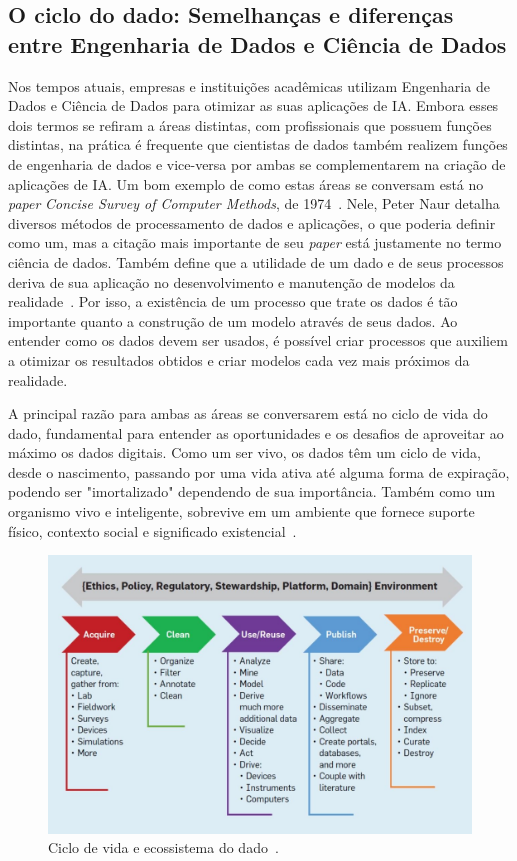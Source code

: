 \documentclass[Portugues,Final]{ic-tese-v3}
\begin{document}
\subsection{O ciclo do dado: Semelhanças e diferenças entre Engenharia de Dados e Ciência de Dados}

Nos tempos atuais, empresas e instituições acadêmicas utilizam Engenharia de Dados e Ciência de Dados para otimizar as suas aplicações de IA. Embora esses dois termos se refiram a áreas distintas, com profissionais que possuem funções distintas, na prática é frequente que cientistas de dados também realizem funções de engenharia de dados e vice-versa por ambas se complementarem na criação de aplicações de IA. Um bom exemplo de como estas áreas se conversam está no \textit{paper} \textit{Concise Survey of Computer Methods}, de 1974~\cite{Panoply_2017}. Nele, Peter Naur detalha diversos métodos de processamento de dados e aplicações, o que poderia definir como um, mas a citação mais importante de seu \textit{paper} está justamente no termo ciência de dados. Também define que a utilidade de um dado e de seus processos deriva de sua aplicação no desenvolvimento e manutenção de modelos da realidade~\cite{Foote_2021}. Por isso, a existência de um processo que trate os dados é tão importante quanto a construção de um modelo através de seus dados. Ao entender como os dados devem ser usados, é possível criar processos que auxiliem a otimizar os resultados obtidos e criar modelos cada vez mais próximos da realidade.

A principal razão para ambas as áreas se conversarem está no ciclo de vida do dado, fundamental para entender as oportunidades e os desafios de aproveitar ao máximo os dados digitais. Como um ser vivo, os dados têm um ciclo de vida, desde o nascimento, passando por uma vida ativa até alguma forma de expiração, podendo ser "imortalizado" dependendo de sua importância. Também como um organismo vivo e inteligente, sobrevive em um ambiente que fornece suporte físico, contexto social e significado existencial~\cite{Berman_2018}.

\begin{figure}[h]
\centering
\includegraphics[scale=0.6]{images/data_life_cycle.jpg}
\caption {Ciclo de vida e ecossistema do dado~\cite{Berman_2018}.}
\label{fig:cicloDado}
\end{figure}
\end{document}

